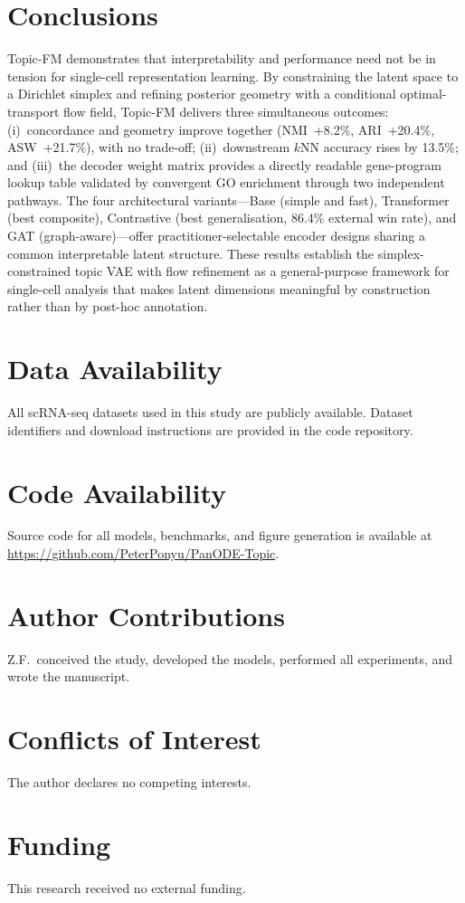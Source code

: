 \documentclass[biology,article,submit,pdftex,moreauthors]{Definitions/mdpi}
\begin{document}
\section{Conclusions}\label{sec:conclusions}
Topic-FM demonstrates that interpretability and performance need not be in tension for single-cell representation learning. By constraining the latent space to a Dirichlet simplex and refining posterior geometry with a conditional optimal-transport flow field, Topic-FM delivers three simultaneous outcomes: (i)~concordance and geometry improve together (NMI~+8.2\%, ARI~+20.4\%, ASW~+21.7\%), with no trade-off; (ii)~downstream $k$NN accuracy rises by 13.5\%; and (iii)~the decoder weight matrix provides a directly readable gene-program lookup table validated by convergent GO enrichment through two independent pathways. The four architectural variants---Base (simple and fast), Transformer (best composite), Contrastive (best generalisation, 86.4\% external win rate), and GAT (graph-aware)---offer practitioner-selectable encoder designs sharing a common interpretable latent structure. These results establish the simplex-constrained topic VAE with flow refinement as a general-purpose framework for single-cell analysis that makes latent dimensions meaningful by construction rather than by post-hoc annotation.

\section*{Data Availability}
All scRNA-seq datasets used in this study are publicly available. Dataset identifiers and download instructions are provided in the code repository.

\section*{Code Availability}
Source code for all models, benchmarks, and figure generation is available at \url{https://github.com/PeterPonyu/PanODE-Topic}.

\section*{Author Contributions}
Z.F.\ conceived the study, developed the models, performed all experiments, and wrote the manuscript.

\section*{Conflicts of Interest}
The author declares no competing interests.

\section*{Funding}
This research received no external funding.


\end{document}
